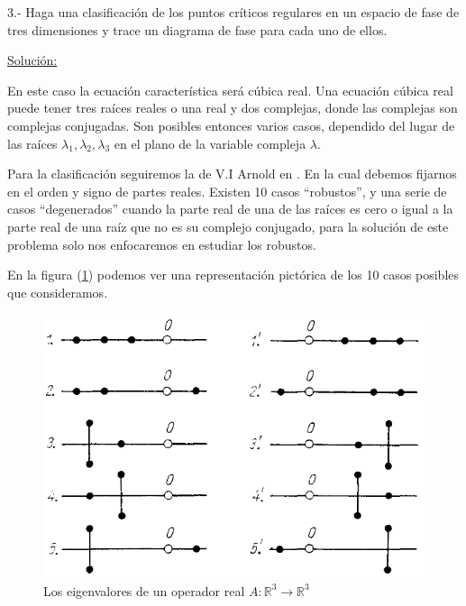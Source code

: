 \documentclass[a4paper,10pt]{article}
\begin{document}

\vspace{.3cm}

\newpage

3.- Haga una clasificación de los puntos críticos regulares en un espacio de fase 
de tres dimensiones y trace un diagrama de fase para cada uno de ellos.

\vspace{.3cm}

\underline{Solución:}\vspace{.3cm}

En este caso la ecuación característica será cúbica real. Una ecuación cúbica real puede
tener tres raíces reales o una real y dos complejas, donde las complejas son complejas conjugadas.
Son posibles entonces varios casos, dependido del lugar de las raíces $\lambda_1, \lambda_2, \lambda_3$
en el plano de la variable compleja $\lambda$.

Para la clasificación seguiremos la de V.I Arnold en \cite{arnold}. En la cual debemos
fijarnos en el orden y signo de partes reales. Existen 10 casos ``robustos'', y una 
serie de casos ``degenerados'' cuando la parte real de una de las raíces es cero
o igual a la parte real de una raíz que no es su complejo conjugado, para la 
solución de este problema solo nos enfocaremos en estudiar los robustos. 

\vspace{.3cm}

En la figura (\ref{fig:problema3fig1}) podemos ver una representación pictórica de los
10 casos posibles que consideramos. 

\begin{figure}[h!]
 \centering
\includegraphics[scale=0.3]{problema3fig1}
\caption{Los eigenvalores de un operador real $A: \mathbb{R}^3 \rightarrow \mathbb{R}^3$}
\label{fig:problema3fig1}
\end{figure}
\end{document}
